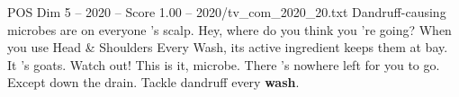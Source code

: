 \begin{textsample}{POS Dim 5 – 2020 – Score 1.00 – 2020/tv\_com\_2020\_20.txt}  \label{ex:f5_pos_035}
Dandruff-causing microbes are on everyone 's scalp.
Hey, where do you think you 're going?
When you use Head \& Shoulders Every Wash, its active ingredient keeps them at bay.
It 's goats.
Watch out!
This is it, microbe.
There 's nowhere left for you to go.
Except down the drain.
Tackle dandruff every \textbf{wash}.

\end{textsample}
